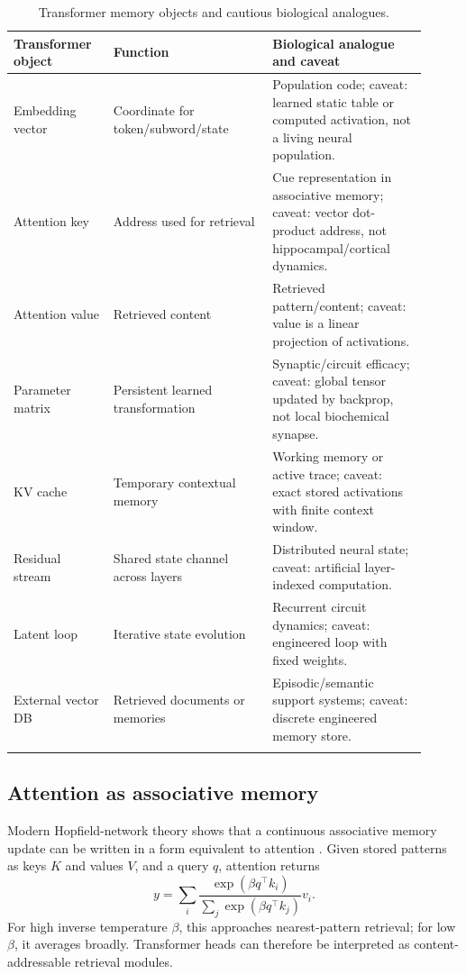 \documentclass[11pt]{article}
\newcommand{\1}{\mathbf{1}}
\begin{document}
\begin{longtable}{p{0.22\linewidth}p{0.35\linewidth}p{0.34\linewidth}}
\toprule
Transformer object & Function & Biological analogue and caveat \\
\midrule
Embedding vector & Coordinate for token/subword/state & Population code; caveat: learned static table or computed activation, not a living neural population. \\
Attention key & Address used for retrieval & Cue representation in associative memory; caveat: vector dot-product address, not hippocampal/cortical dynamics. \\
Attention value & Retrieved content & Retrieved pattern/content; caveat: value is a linear projection of activations. \\
Parameter matrix & Persistent learned transformation & Synaptic/circuit efficacy; caveat: global tensor updated by backprop, not local biochemical synapse. \\
KV cache & Temporary contextual memory & Working memory or active trace; caveat: exact stored activations with finite context window. \\
Residual stream & Shared state channel across layers & Distributed neural state; caveat: artificial layer-indexed computation. \\
Latent loop & Iterative state evolution & Recurrent circuit dynamics; caveat: engineered loop with fixed weights. \\
External vector DB & Retrieved documents or memories & Episodic/semantic support systems; caveat: discrete engineered memory store. \\
\bottomrule
\caption{Transformer memory objects and cautious biological analogues.}
\end{longtable}

\subsection{Attention as associative memory}

Modern Hopfield-network theory shows that a continuous associative memory update can be written in a form equivalent to attention \cite{Ramsauer2021}. Given stored patterns as keys $K$ and values $V$, and a query $q$, attention returns
\[
y=\sum_i \frac{\exp(\beta q^\top k_i)}{\sum_j\exp(\beta q^\top k_j)}v_i.
\]
For high inverse temperature $\beta$, this approaches nearest-pattern retrieval; for low $\beta$, it averages broadly. Transformer heads can therefore be interpreted as content-addressable retrieval modules.
\end{document}
